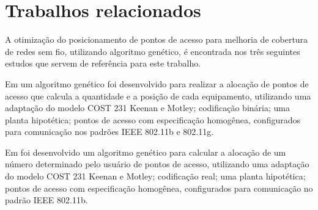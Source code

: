 \documentclass[tc,twoside]{iiufrgs}
\begin{document}










\chapter{Trabalhos relacionados} 

A otimização do posicionamento de pontos de acesso para melhoria de cobertura de redes sem fio, utilizando algoritmo genético, é encontrada nos três seguintes estudos que servem de referência para este trabalho.

Em \cite{ji2002methods} um algoritmo genético foi desenvolvido para realizar a alocação de pontos de acesso que calcula a quantidade e a posição de cada equipamento, utilizando uma adaptação do modelo COST 231 Keenan e Motley; codificação binária; uma planta hipotética; pontos de acesso com especificação homogênea, configurados para comunicação nos padrões IEEE 802.11b e 802.11g.

Em \cite{vellasco2010dimensionamento} foi desenvolvido um algoritmo genético para calcular a alocação de um número determinado pelo usuário de pontos de acesso, utilizando uma adaptação do modelo COST 231 Keenan e Motley; codificação real; uma planta hipotética; pontos de acesso com especificação homogênea, configurados para comunicação no padrão IEEE 802.11b.
\end{document}
